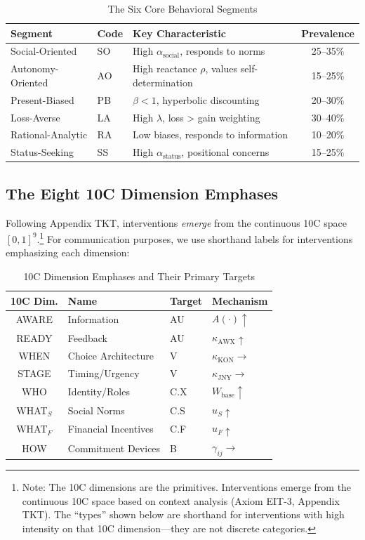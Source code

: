 \begin{table}[htbp]
\centering
\caption{The Six Core Behavioral Segments}
\label{tab:qq-segments}
\renewcommand{\arraystretch}{1.4}
\begin{tabular}{@{}llp{5cm}c@{}}
\toprule
\textbf{Segment} & \textbf{Code} & \textbf{Key Characteristic} & \textbf{Prevalence} \\
\midrule
Social-Oriented & SO & High $\alpha_{\text{social}}$, responds to norms & 25--35\% \\
Autonomy-Oriented & AO & High reactance $\rho$, values self-determination & 15--25\% \\
Present-Biased & PB & $\beta < 1$, hyperbolic discounting & 20--30\% \\
Loss-Averse & LA & High $\lambda$, loss > gain weighting & 30--40\% \\
Rational-Analytic & RA & Low biases, responds to information & 10--20\% \\
Status-Seeking & SS & High $\alpha_{\text{status}}$, positional concerns & 15--25\% \\
\bottomrule
\end{tabular}
\end{table}

\subsection{The Eight 10C Dimension Emphases}

Following Appendix TKT, interventions \textit{emerge} from the continuous 10C space $[0,1]^9$.\footnote{Note: The 10C dimensions are the primitives. Interventions emerge from the continuous 10C space based on context analysis (Axiom EIT-3, Appendix TKT). The ``types'' shown below are shorthand for interventions with high intensity on that 10C dimension---they are not discrete categories.} For communication purposes, we use shorthand labels for interventions emphasizing each dimension:

\begin{table}[htbp]
\centering
\caption{10C Dimension Emphases and Their Primary Targets}
\label{tab:qq-types}
\renewcommand{\arraystretch}{1.3}
\begin{tabular}{@{}clll@{}}
\toprule
\textbf{10C Dim.} & \textbf{Name} & \textbf{Target} & \textbf{Mechanism} \\
\midrule
AWARE & Information & AU & $A(\cdot) \uparrow$ \\
READY & Feedback & AU & $\kappa_{\text{AWX}} \uparrow$ \\
WHEN & Choice Architecture & V & $\kappa_{\text{KON}} \rightarrow$ \\
STAGE & Timing/Urgency & V & $\kappa_{\text{JNY}} \rightarrow$ \\
WHO & Identity/Roles & C.X & $W_{\text{base}} \uparrow$ \\
WHAT$_S$ & Social Norms & C.S & $u_S \uparrow$ \\
WHAT$_F$ & Financial Incentives & C.F & $u_F \uparrow$ \\
HOW & Commitment Devices & B & $\gamma_{ij} \rightarrow$ \\
\bottomrule
\end{tabular}
\end{table}


